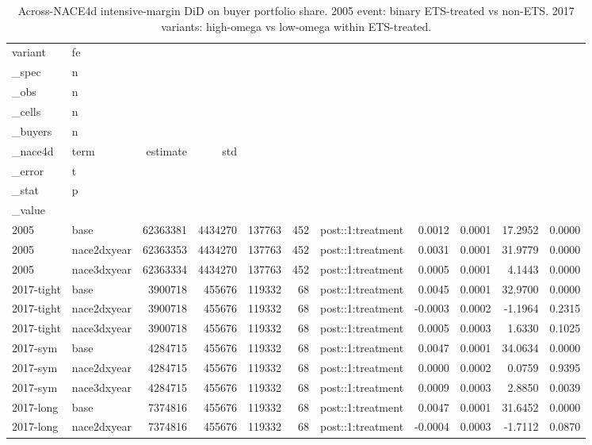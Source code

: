 \begin{table}[ht]
\centering
\caption{Across-NACE4d intensive-margin DiD on buyer portfolio share. 2005 event: binary ETS-treated vs non-ETS. 2017 variants: high-omega vs low-omega within ETS-treated.} 
\begin{tabular}{llrrrrlrrrr}
  \toprule
variant & fe\\_spec & n\\_obs & n\\_cells & n\\_buyers & n\\_nace4d & term & estimate & std\\_error & t\\_stat & p\\_value \\ 
  \midrule
2005 & base & 62363381 & 4434270 & 137763 &   452 & post::1:treatment & 0.0012 & 0.0001 & 17.2952 & 0.0000 \\ 
  2005 & nace2dxyear & 62363353 & 4434270 & 137763 &   452 & post::1:treatment & 0.0031 & 0.0001 & 31.9779 & 0.0000 \\ 
  2005 & nace3dxyear & 62363334 & 4434270 & 137763 &   452 & post::1:treatment & 0.0005 & 0.0001 & 4.1443 & 0.0000 \\ 
  2017-tight & base & 3900718 & 455676 & 119332 &    68 & post::1:treatment & 0.0045 & 0.0001 & 32.9700 & 0.0000 \\ 
  2017-tight & nace2dxyear & 3900718 & 455676 & 119332 &    68 & post::1:treatment & -0.0003 & 0.0002 & -1.1964 & 0.2315 \\ 
  2017-tight & nace3dxyear & 3900718 & 455676 & 119332 &    68 & post::1:treatment & 0.0005 & 0.0003 & 1.6330 & 0.1025 \\ 
  2017-sym & base & 4284715 & 455676 & 119332 &    68 & post::1:treatment & 0.0047 & 0.0001 & 34.0634 & 0.0000 \\ 
  2017-sym & nace2dxyear & 4284715 & 455676 & 119332 &    68 & post::1:treatment & 0.0000 & 0.0002 & 0.0759 & 0.9395 \\ 
  2017-sym & nace3dxyear & 4284715 & 455676 & 119332 &    68 & post::1:treatment & 0.0009 & 0.0003 & 2.8850 & 0.0039 \\ 
  2017-long & base & 7374816 & 455676 & 119332 &    68 & post::1:treatment & 0.0047 & 0.0001 & 31.6452 & 0.0000 \\ 
  2017-long & nace2dxyear & 7374816 & 455676 & 119332 &    68 & post::1:treatment & -0.0004 & 0.0003 & -1.7112 & 0.0870 \\ 

\end{tabular}
\end{table}
